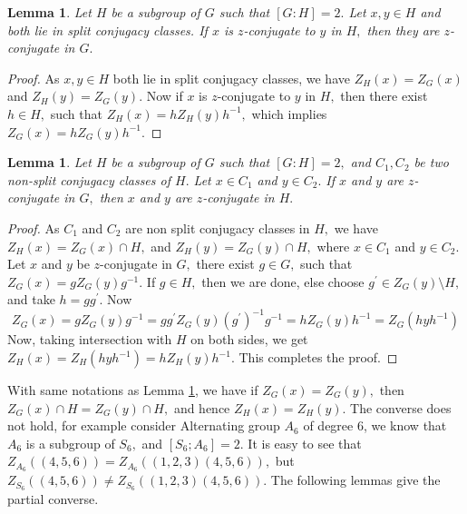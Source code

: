 \documentclass[12pt,twoside,reqno]{amsart}
\newtheorem{lemma}[theorem]{Lemma}
\theoremstyle{definition}
\numberwithin{equation}{section}
\begin{document}
\begin{lemma}\label{Lemma_split}
Let $H$ be a subgroup of $G$ such that $[G:H]=2.$ Let $x,y \in H$ and both lie in split conjugacy classes. If $x$ is $z$-conjugate to $y$ in $H,$ then they are $z$-conjugate in $G.$
\end{lemma}
\begin{proof}
    As $x,y\in H$ both lie in split conjugacy classes, we have $Z_H(x)=Z_G(x)$ and $Z_H(y)=Z_G(y).$ Now if $x$ is $z$-conjugate to $y$ in $H,$ then there exist $h\in H,$ such that $Z_H(x)=hZ_H(y)h^{-1},$ which implies $Z_G(x)=hZ_G(y)h^{-1}.$
\end{proof}
\begin{lemma}\label{Lemma1_index2}
Let $H$ be a subgroup of $G$ such that $[G:H]=2,$ and $C_1,C_2$ be two non-split conjugacy classes of $H.$ Let $x\in C_1$ and $y\in C_2.$ If $x$ and $y$ are $z$-conjugate in $G, $ then $x$ and $y$ are $z$-conjugate in $H.$
\end{lemma}
\begin{proof}
    As $C_1$ and $C_2$ are non split conjugacy classes in $H,$ we have $Z_H(x)=Z_G(x)\cap H, $ and $Z_H(y)=Z_G(y)\cap H, $ where $x\in C_1$ and $y\in C_2.$ Let $x$ and $y$ be $z$-conjugate in $G, $ there exist $g\in G,$ such that $Z_G(x)=gZ_G(y)g^{-1}.$ If $g\in H,$ then we are done, else choose $g^\prime\in Z_G(y)\setminus H,$ and take $h=gg^\prime.$ Now $$Z_G(x)=gZ_G(y)g^{-1}=gg^\prime Z_G(y)(g^\prime)^{-1}g^{-1}=hZ_G(y)h^{-1}=Z_G(hyh^{-1})$$ 
    Now, taking intersection with $H$ on both sides, we get $Z_H(x)=Z_H(hyh^{-1})=hZ_H(y)h^{-1}.$ This completes the proof.
\end{proof}
With same notations as Lemma \ref{Lemma1_index2},
we have if $Z_G(x)=Z_G(y),$ 
then $Z_G(x)\cap H = Z_G(y)\cap H,$ and hence $Z_H(x)=Z_H(y).$ 
The converse does not hold, for example consider Alternating group $A_6$ of degree 6, we know that $A_6$ is a subgroup of $S_6,$ and $[S_6; A_6]=2.$ It is easy to see that $Z_{A_6}((4,5,6))=Z_{A_6}((1,2,3)(4,5,6)),$ but $Z_{S_6}((4,5,6))\neq Z_{S_6}((1,2,3)(4,5,6)).$ The following lemmas give the partial converse.
\end{document}
